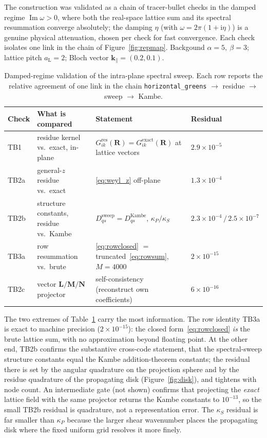 \documentclass[11pt,a4paper]{article}
\newcommand{\ii}{\mathrm{i}}
\newcommand{\Imm}{\operatorname{Im}}
\newcommand{\kpar}{\mathbf{k}_{\parallel}}
\newcommand{\vR}{\mathbf{R}}
\newcommand{\aL}{a_{\mathrm{L}}}
\newcommand{\Dqs}{D_{q s}}
\begin{document}
The construction was validated as a chain of tracer-bullet checks in the damped
regime $\Imm\omega>0$, where both the real-space lattice sum and its spectral
resummation converge absolutely; the damping $\eta$ (with
$\omega=2\pi(1+\ii\eta)$) is a genuine physical attenuation, chosen per check
for fast convergence. Each check isolates one link in the chain
of Figure~\ref{fig:repmap}. Backgound $\alpha=5,\ \beta=3$; lattice
pitch $\aL=2$; Bloch vector $\kpar=(0.2,0.1)$.

\begin{table}[ht]
\centering
\caption{Damped-regime validation of the intra-plane spectral sweep. Each row
  reports the relative agreement of one link in the chain
  \texttt{horizontal\_greens} $\to$ residue $\to$ sweep $\to$ Kambe.}
\label{tab:results}
\small
\begin{tabularx}{\textwidth}{@{}l X X l@{}}
\toprule
Check & What is compared & Statement & Residual\\
\midrule
TB1  & residue kernel vs.\ exact, in-plane
     & $G^{\mathrm{res}}_{ik}(\vR)=G^{\mathrm{exact}}_{ik}(\vR)$ at lattice vectors
     & $2.9\times10^{-5}$\\
TB2a & general-$z$ residue vs.\ exact
     & \eqref{eq:weyl_z} off-plane
     & $1.3\times10^{-4}$\\
TB2b & structure constants, residue vs.\ Kambe
     & $\Dqs^{\mathrm{sweep}}=\Dqs^{\mathrm{Kambe}}$, $\kappa_P/\kappa_S$
     & $2.3\times10^{-4}\,/\,2.5\times10^{-7}$\\
TB3a & row resummation vs.\ brute
     & \eqref{eq:rowclosed} $=$ truncated~\eqref{eq:rowsum}, $M{=}4000$
     & $2\times10^{-15}$\\
TB2c & vector $\mathbf L/\mathbf M/\mathbf N$ projector
     & self-consistency (reconstruct own coefficients)
     & $6\times10^{-16}$\\
\bottomrule
\end{tabularx}
\end{table}

The two extremes of Table~\ref{tab:results} carry the most information. The row
identity TB3a is exact to machine precision ($2\times10^{-15}$): the closed
form~\eqref{eq:rowclosed} \emph{is} the brute lattice sum, with no approximation
beyond floating point. At the other end, TB2b confirms the substantive
cross-code statement, that the spectral-sweep structure constants equal the
Kambe addition-theorem constants; the residual there is set by the angular
quadrature on the projection sphere and by the residue quadrature of the
propagating disk (Figure~\ref{fig:disk}), and tightens with node count. An
intermediate gate (not shown) confirms that projecting the \emph{exact} lattice
field with the same projector returns the Kambe constants to $10^{-13}$, so the
small TB2b residual is quadrature, not a representation error. The
$\kappa_S$ residual is far smaller than $\kappa_P$ because the larger shear
wavenumber places the propagating disk where the fixed uniform grid resolves it
more finely.
\end{document}
